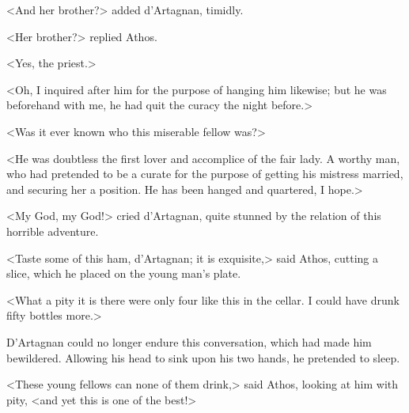 <And her brother?> added d'Artagnan, timidly. 

<Her brother?> replied Athos. 

<Yes, the priest.> 

<Oh, I inquired after him for the purpose of hanging him likewise; but he was beforehand with me, he had quit the curacy the night before.> 

<Was it ever known who this miserable fellow was?> 

<He was doubtless the first lover and accomplice of the fair lady. A worthy man, who had pretended to be a curate for the purpose of getting his mistress married, and securing her a position. He has been hanged and quartered, I hope.> 

<My God, my God!> cried d'Artagnan, quite stunned by the relation of this horrible adventure. 

<Taste some of this ham, d'Artagnan; it is exquisite,> said Athos, cutting a slice, which he placed on the young man's plate. 

<What a pity it is there were only four like this in the cellar. I could have drunk fifty bottles more.> 

D'Artagnan could no longer endure this conversation, which had made him bewildered. Allowing his head to sink upon his two hands, he pretended to sleep. 

<These young fellows can none of them drink,> said Athos, looking at him with pity, <and yet this is one of the best!> 
